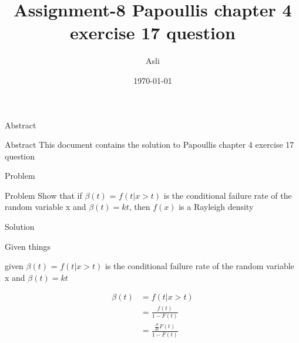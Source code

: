 \documentclass{beamer}
\title{ Assignment-8 Papoullis chapter 4 exercise 17 question}
\author{Asli}
\institute{IIT Hyderabad}
\date{\today }
\begin{document}
\begin{frame}
      \titlepage
\end{frame}



\begin{frame}{Abstract}
     \begin{block}{Abstract}
          This document contains the solution to Papoullis chapter 4 exercise 17 question
      \end{block}
\end{frame}



\begin{frame}{Problem}

          \begin{block}{Problem}
              Show that if $\beta(t)$ = $f(t| x > t)$ is the conditional failure rate of the random variable x and $\beta(t) = kt $, then $f(x)$ is a Rayleigh density
           \end{block}

\end{frame}



\begin{frame}{Solution}

            \begin{block}{Given things}
                 
                    given $\beta(t)$ = $f(t| x > t)$ is the conditional failure rate of the random variable x and $\beta(t) = kt $
                  
                    \begin{align}
                         \beta(t) &= f(t| x > t) \\
                                  &= \frac{f(t)}{1 - F(t)} \\
                                  &= \frac{ \frac{d}{dt}F(t) }{1 - F(t)}
                                  \label{eq:form1}
                    \end{align}
                
            \end{block}
    
\end{frame}
\end{document}
